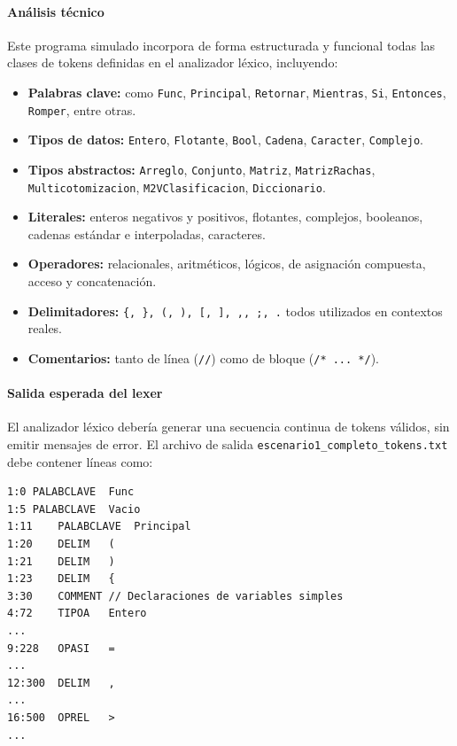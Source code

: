 \documentclass{article}
\begin{document}
\paragraph{Análisis técnico}

Este programa simulado incorpora de forma estructurada y funcional todas las clases de tokens definidas en el analizador léxico, incluyendo:

\begin{itemize}
  \item \textbf{Palabras clave:} como \texttt{Func}, \texttt{Principal}, \texttt{Retornar}, \texttt{Mientras}, \texttt{Si}, \texttt{Entonces}, \texttt{Romper}, entre otras.
  \item \textbf{Tipos de datos:} \texttt{Entero}, \texttt{Flotante}, \texttt{Bool}, \texttt{Cadena}, \texttt{Caracter}, \texttt{Complejo}.
  \item \textbf{Tipos abstractos:} \texttt{Arreglo}, \texttt{Conjunto}, \texttt{Matriz}, \texttt{MatrizRachas}, \texttt{Multicotomizacion}, \texttt{M2VClasificacion}, \texttt{Diccionario}.
  \item \textbf{Literales:} enteros negativos y positivos, flotantes, complejos, booleanos, cadenas estándar e interpoladas, caracteres.
  \item \textbf{Operadores:} relacionales, aritméticos, lógicos, de asignación compuesta, acceso y concatenación.
  \item \textbf{Delimitadores:} \texttt{\{, \}, (, ), [, ], ,, ;, .} todos utilizados en contextos reales.
  \item \textbf{Comentarios:} tanto de línea (\texttt{//}) como de bloque (\texttt{/* ... */}).
\end{itemize}

\paragraph{Salida esperada del lexer}

El analizador léxico debería generar una secuencia continua de tokens válidos, sin emitir mensajes de error. El archivo de salida \texttt{escenario1\_completo\_tokens.txt} debe contener líneas como:

\begin{verbatim}
1:0	PALABCLAVE	Func
1:5	PALABCLAVE	Vacio
1:11	PALABCLAVE	Principal
1:20	DELIM	(
1:21	DELIM	)
1:23	DELIM	{
3:30	COMMENT	// Declaraciones de variables simples
4:72	TIPOA	Entero
...
9:228	OPASI	=
...
12:300	DELIM	,
...
16:500	OPREL	>
...
\end{verbatim}
\end{document}
